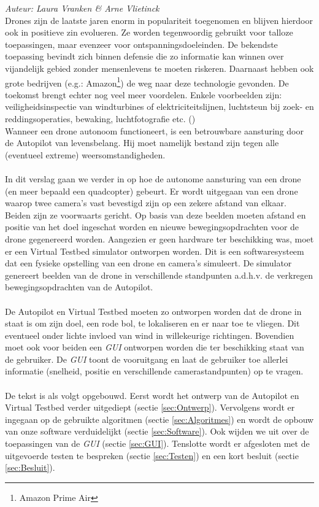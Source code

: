 {\em Auteur: Laura Vranken \& Arne Vlietinck}\\

\noindent
Drones zijn de laatste jaren enorm in populariteit toegenomen en blijven hierdoor ook in positieve zin evolueren. Ze worden tegenwoordig gebruikt voor talloze toepassingen, maar evenzeer voor ontspanningsdoeleinden. De bekendste toepassing bevindt zich binnen defensie die zo informatie kan winnen over vijandelijk gebied zonder mensenlevens te moeten riskeren. Daarnaast hebben ook grote bedrijven (e.g.: Amazon\footnote{Amazon Prime Air}) de weg naar deze technologie gevonden. De toekomst brengt echter nog veel meer voordelen. Enkele voorbeelden zijn: veiligheidsinspectie van windturbines of elektriciteitslijnen, luchtsteun bij zoek- en reddingsoperaties, bewaking, luchtfotografie etc. (\cite{website:microdrones})
\\
Wanneer een drone autonoom functioneert, is een betrouwbare aansturing door de Autopilot van levensbelang. Hij moet namelijk bestand zijn tegen alle (eventueel extreme) weersomstandigheden.
\\
\\
In dit verslag gaan we verder in op hoe de autonome aansturing van een drone (en meer bepaald een quadcopter) gebeurt. Er wordt uitgegaan van een drone waarop twee camera's vast bevestigd zijn op een zekere afstand van elkaar. Beiden zijn ze voorwaarts gericht. Op basis van deze beelden moeten afstand en positie van het doel ingeschat worden en nieuwe bewegingsopdrachten voor de drone gegenereerd worden. Aangezien er geen hardware ter beschikking was, moet er een Virtual Testbed simulator ontworpen worden. Dit is een softwaresysteem dat een fysieke opstelling van een drone en camera's simuleert. \cite{arcticle:opgavePeno} De simulator genereert beelden van de drone in verschillende standpunten a.d.h.v. de verkregen bewegingsopdrachten van de Autopilot. 
\\
\\
De Autopilot en Virtual Testbed moeten zo ontworpen worden dat de drone in staat is om zijn doel, een rode bol, te lokaliseren en er naar toe te vliegen. Dit eventueel onder lichte invloed van wind in willekeurige richtingen. Bovendien moet ook voor beiden een \textit{GUI} ontworpen worden die ter beschikking staat van de gebruiker. De \textit{GUI} toont de vooruitgang en laat de gebruiker toe allerlei informatie (snelheid, positie en verschillende camerastandpunten) op te vragen.
\\
\\
De tekst is als volgt opgebouwd. Eerst wordt het ontwerp van de Autopilot en Virtual Testbed verder uitgediept (sectie \ref{sec:Ontwerp}). Vervolgens wordt er ingegaan op de gebruikte algoritmen (sectie \ref{sec:Algoritmes}) en wordt de opbouw van onze software verduidelijkt (sectie \ref{sec:Software}). Ook wijden we uit over de toepassingen van de \textit{GUI} (sectie \ref{sec:GUI}). Tenslotte wordt er afgesloten met de uitgevoerde testen te bespreken (sectie \ref{sec:Testen}) en een kort besluit (sectie \ref{sec:Besluit}). \\
